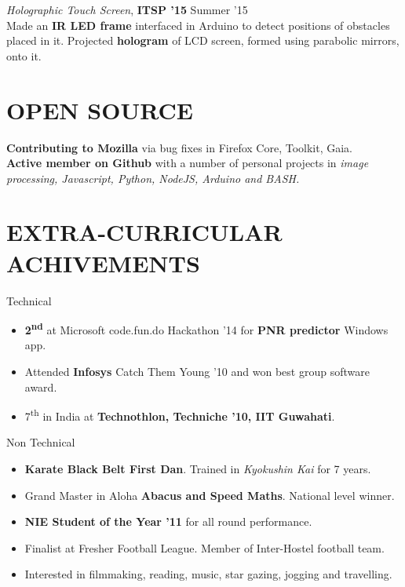 \documentclass[margin, 10pt]{res} %
\begin{document}
\begin{resume}
{\sl Holographic Touch Screen}, \textbf{ITSP '15} \hfill Summer '15 \\
Made an \textbf{IR LED frame} interfaced in Arduino to detect positions of obstacles placed in it. Projected \textbf{hologram} of LCD screen, formed using parabolic mirrors, onto it.
\section{OPEN SOURCE}
\textbf{Contributing to Mozilla} via bug fixes in Firefox Core, Toolkit, Gaia.\\ 
\textbf{Active member on Github} with a number of personal projects in \textit{image processing, Javascript, Python, NodeJS, Arduino  and BASH.}

\section{EXTRA-CURRICULAR \\ ACHIVEMENTS} 
Technical
\begin{itemize}\itemsep -13pt
\item\textbf{2\textsuperscript{nd}} at Microsoft code.fun.do Hackathon '14 for \textbf{PNR predictor} Windows app.\\
\item Attended \textbf{Infosys} Catch Them Young '10 and won best group software award.\\
\item 7\textsuperscript{th} in India at \textbf{Technothlon, Techniche '10, IIT Guwahati}.
\end{itemize}
Non Technical 
\begin{itemize}\itemsep -13pt
\item \textbf{Karate Black Belt First Dan}. Trained in \textit{Kyokushin Kai} for 7 years.\\
\item Grand Master in Aloha \textbf{Abacus and Speed Maths}. National level winner.\\
\item \textbf{NIE Student of the Year '11} for all round performance.\\
\item Finalist at Fresher Football League. Member of Inter-Hostel football team.\\
\item Interested in filmmaking, reading, music, star gazing, jogging and travelling.
\end{itemize}


\end{resume}
\end{document}
